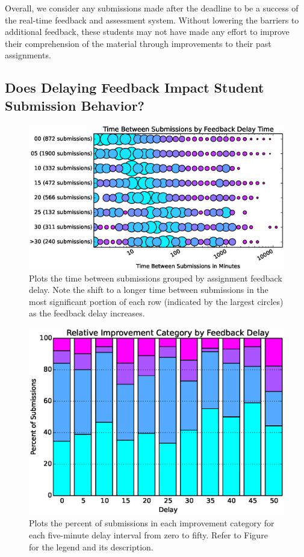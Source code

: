 Overall, we consider any submissions made after the deadline to be a success of
the real-time feedback and assessment system. Without lowering the barriers to
additional feedback, these students may not have made any effort to improve
their comprehension of the material through improvements to their past
assignments.

\subsection{Does Delaying Feedback Impact Student Submission Behavior?}

\begin{figure}[!t]
\centering
\includegraphics[width=5.75in]{graphs/Time_Between_Submissions_by_Feedback_Delay_Time.eps}
\caption{Plots the time between submissions grouped by assignment feedback
  delay. Note the shift to a longer time between submissions in the most
  significant portion of each row (indicated by the largest circles) as the
  feedback delay increases.}
\end{figure}

\begin{figure}[!t]
\centering
\includegraphics[width=5.25in]{graphs/Relative_Improvement_Category_by_Feedback_Delay.eps}
\caption{Plots the percent of submissions in each improvement category for each
  five-minute delay interval from zero to fifty. Refer to
  Figure~ for the legend and its description.}
\end{figure}

